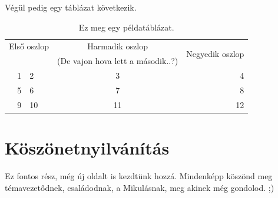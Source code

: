 \documentclass[a4paper, 12pt]{article}
\numberwithin{equation}{section}          %
\numberwithin{figure}{subsection}
\begin{document}
Végül pedig egy táblázat következik.

\begin{table}[h!]
\caption{Ez meg egy példatáblázat.}
\label{tab:tab}
\begin{center}
\small
  \begin{tabular}{r@{,}lc||r}

\hline
\hline
    \multicolumn{2}{c}{Első oszlop} & Harmadik oszlop & \multirow{2}{*}{Negyedik oszlop} \\
     \multicolumn{2}{c}{}           & (De vajon hova lett a második..?) & \\
\hline
\hline
  1 & 2 & 3 & 4 \\
  5 & 6 & 7 & 8 \\
\hline
  9 & 10 & 11 & 12 \\
\hline
\hline

\end{tabular}
\end{center}
\end{table}



\clearpage 

\vspace*{2cm}

\section*{Köszönetnyilvánítás}
Ez fontos rész, még új oldalt is kezdtünk hozzá. Mindenképp köszönd meg témavezetődnek, családodnak, a Mikulásnak, meg akinek még gondolod. ;)


\newpage \vspace*{2cm}

       
       
%
% 
\end{document}
